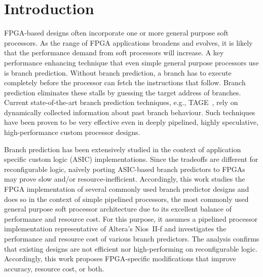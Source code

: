 \chapter{Introduction}
\label{chap:introduction}
FPGA-based designs often incorporate one or more general purpose soft processors. As the range of FPGA applications broadens and evolves, it is likely that the performance demand from soft processors will increase. A key performance enhancing technique that even simple general purpose processors use is branch prediction. Without branch prediction, a branch has to execute completely before the processor can fetch the instructions that follow. Branch prediction eliminates these stalls by guessing the target address of branches. Current state-of-the-art branch prediction techniques, e.g., TAGE~\cite{tage}, rely on dynamically collected information about past branch behaviour. Such techniques have been proven to be very effective even in deeply pipelined, highly speculative, high-performance custom processor designs.

Branch prediction has been extensively studied in the context of application specific custom logic (ASIC) implementations. Since the tradeoffs are different for reconfigurable logic, na\"ively porting ASIC-based branch predictors to FPGAs may prove slow and/or resource-inefficient. Accordingly, this work studies the FPGA implementation of several commonly used branch predictor designs and does so in the context of simple pipelined processors, the most commonly used general purpose soft processor architecture due to its excellent balance of performance  and resource cost. For this purpose, it assumes a pipelined processor implementation representative of Altera's Nios~II-f and investigates the performance and resource cost of various branch predictors. The analysis confirms that existing designs are not efficient nor high-performing on reconfigurable logic. Accordingly, this work proposes FPGA-specific modifications that improve accuracy, resource cost, or both.

